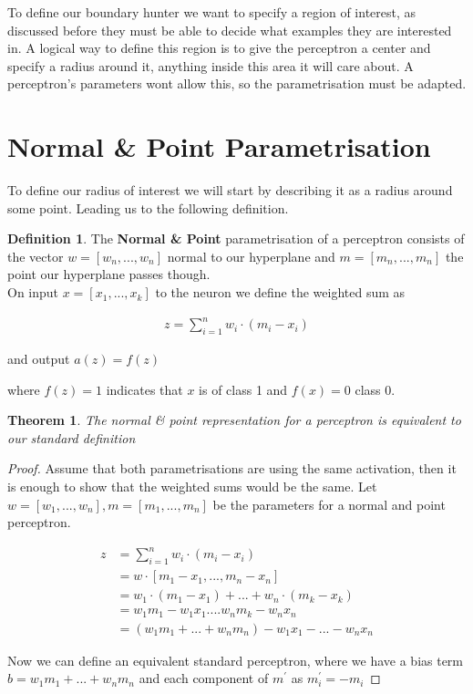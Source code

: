 \documentclass[notitlepage]{report}
\newtheorem{theorem}{Theorem}
\theoremstyle{definition}
\newtheorem{definition}{Definition}[section]
\begin{document}
To define our boundary hunter we want to specify a region of interest, as discussed before they must be able to decide what examples they are interested in. A logical way to define this region is to give the perceptron a center and specify a radius around it, anything inside this area it will care about. A perceptron's parameters wont allow this, so the parametrisation must be adapted.

\section{Normal \& Point Parametrisation}
To define our radius of interest we will start by describing it as a radius around some point. Leading us to the following definition.

\theoremstyle{definition}
\begin{definition}
	The \textbf{Normal \& Point} parametrisation of a perceptron consists of the vector $w = [w_n, ..., w_n]$ normal to our hyperplane and $m = [m_n, ..., m_n]$ the point our hyperplane passes though.\\
	
	On input $x = [x_1, ..., x_k]$ to the neuron we define the weighted sum as 
	
	\begin{align*}
	z = \sum_{i=1}^n w_i \cdot (m_i - x_i)
	\end{align*}
	
	and output $a(z) = f(z)$
	
	where $f(z) = 1$ indicates that $x$ is of class 1 and $f(x) = 0$ class 0.
\end{definition}

\begin{theorem}
The normal \& point representation for a perceptron is equivalent to our standard definition
\end{theorem}

\begin{proof}
Assume that both parametrisations are using the same activation, then it is enough to show that the weighted sums would be the same. Let $w = [w_1, ..., w_n], m = [m_1, ..., m_n]$ be the parameters for a normal and point perceptron.

\begin{align*}
z &= \sum_{i=1}^n w_i \cdot (m_i - x_i)\\
&= w \cdot [m_1 - x_1, ..., m_n - x_n]\\
&= w_1 \cdot (m_1 - x_1) + ... + w_n \cdot (m_k - x_k)\\
&= w_1m_1 - w_1x_1 .... w_nm_k - w_nx_n\\
&= (w_1m_1 + ... + w_nm_n) - w_1x_1 - ... - w_nx_n
\end{align*}

Now we can define an equivalent standard perceptron, where we have a bias term $b = w_1m_1 + ... + w_nm_n$ and each component of $m^{'}$ as $m^{'}_i = -m_i$
\end{proof}
\end{document}
